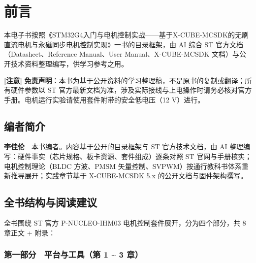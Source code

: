 \documentclass[
  UTF8,
  scheme=plain,
  fontsize=10pt,
  openany
]{ctexbook}
\begin{document}


\frontmatter
{}

\cleardoublepage
\tableofcontents

\clearpage
\makeatletter\@mainmattertrue\makeatother
{}

\clearpage

\chapter*{前言}\label{ux524dux8a00}

\begin{epigraph}

本电子书按照《STM32G4入门与电机控制实战------基于X-CUBE-MCSDK的无刷直流电机与永磁同步电机控制实现》一书的目录框架，由
AI 综合 ST 官方文档（Datasheet、Reference Manual、User
Manual、X-CUBE-MCSDK 文档）与公开技术资料整理编写，供学习参考之用。

\textbf{[注意]}
\textbf{免责声明}：本书为基于公开资料的学习整理稿，不是原书的复制或翻译；所有硬件参数以
ST
官方最新文档为准，涉及实际接线与上电操作时请务必核对官方手册。电机运行实验请使用套件附带的安全低电压（12
V）进行。

\end{epigraph}

\section*{编者简介}\label{ux7f16ux8005ux7b80ux4ecb}

\textbf{李佳伦}　本书编者。内容基于公开的目录框架与 ST 官方技术文档，由
AI 整理编写：硬件事实（芯片规格、板卡资源、套件组成）逐条对照 ST
官网与手册核实；电机控制理论（BLDC 方波、PMSM
矢量控制、SVPWM）按通行教科书体系重新推导展开；实践章节基于 X-CUBE-MCSDK
5.x 的公开文档与固件架构撰写。

\section*{全书结构与阅读建议}\label{ux5168ux4e66ux7ed3ux6784ux4e0eux9605ux8bfbux5efaux8bae}

全书围绕 ST 官方 P-NUCLEO-IHM03 电机控制套件展开，分为四个部分，共 8
章正文 + 附录：

\subsection*{\texorpdfstring{第一部分　平台与工具（第 1
\textasciitilde{} 3
章）}{第一部分　平台与工具（第 1  3 章）}}\label{ux7b2cux4e00ux90e8ux5206-ux5e73ux53f0ux4e0eux5de5ux5177ux7b2c-1-3-ux7ae0}
\end{document}
